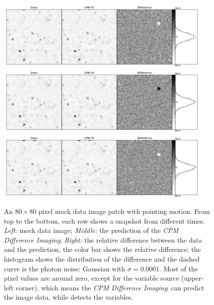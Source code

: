 \documentclass[12pt, preprint]{aastex}
\newcommand{\project}[1]{\textsl{#1}}
\newcommand{\cpmdiff}{\project{CPM Difference Imaging}}
\begin{document}
\begin{figure}[p]
\begin{center}
\includegraphics[width=0.95\textwidth]{f1a}
\includegraphics[width=0.95\textwidth]{f1b}
\includegraphics[width=0.95\textwidth]{f1c}
\end{center}
\caption{
\label{space}
  An $80\times 80$ pixel mock data image patch with pointing motion. 
  From top to the bottom,  each row shows a snapshot from different times.
  \emph{Left:} mock data image;
  \emph{Middle:} the prediction of the \cpmdiff;
  \emph{Right:} the relative difference between the data and the prediction, the color bar shows the relative difference;
  the histogram shows the distribution of the difference and the dashed curve is the photon noise: Gaussian with $\sigma = 0.0001$.
  Most of the pixel values are around zero, except for the variable source (upper-left corner), which means the \cpmdiff\ can predict the image data, while detects the variables. 
}
\end{figure}
\end{document}
